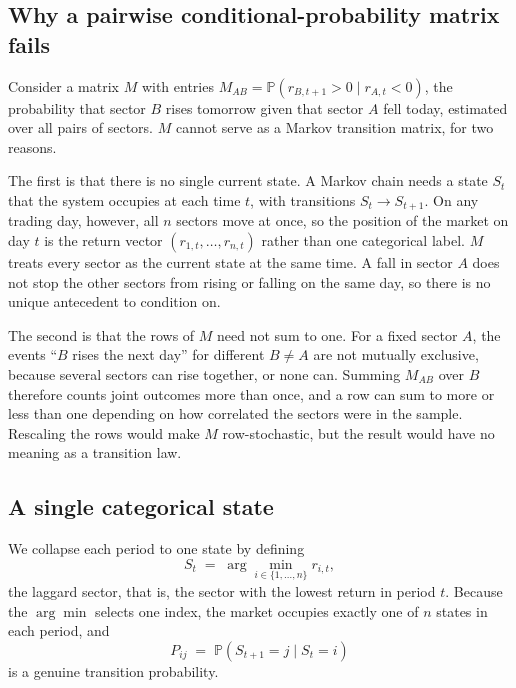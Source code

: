 \documentclass[11pt]{article}
\begin{document}
\subsection{Why a pairwise conditional-probability matrix fails}

Consider a matrix $M$ with entries $M_{AB} = \mathbb P(r_{B,t+1} > 0 \mid r_{A,t} < 0)$, the probability that sector $B$ rises tomorrow given that sector $A$ fell today, estimated over all pairs of sectors. $M$ cannot serve as a Markov transition matrix, for two reasons.

The first is that there is no single current state. A Markov chain needs a state $S_t$ that the system occupies at each time $t$, with transitions $S_t \to S_{t+1}$. On any trading day, however, all $n$ sectors move at once, so the position of the market on day $t$ is the return vector $(r_{1,t},\dots,r_{n,t})$ rather than one categorical label. $M$ treats every sector as the current state at the same time. A fall in sector $A$ does not stop the other sectors from rising or falling on the same day, so there is no unique antecedent to condition on.

The second is that the rows of $M$ need not sum to one. For a fixed sector $A$, the events ``$B$ rises the next day'' for different $B \neq A$ are not mutually exclusive, because several sectors can rise together, or none can. Summing $M_{AB}$ over $B$ therefore counts joint outcomes more than once, and a row can sum to more or less than one depending on how correlated the sectors were in the sample. Rescaling the rows would make $M$ row-stochastic, but the result would have no meaning as a transition law.

\subsection{A single categorical state}

We collapse each period to one state by defining
\begin{equation}
S_t \;=\; \arg\min_{i \in \{1,\dots,n\}} r_{i,t},
\label{eq:laggard}
\end{equation}
the laggard sector, that is, the sector with the lowest return in period $t$. Because the $\arg\min$ selects one index, the market occupies exactly one of $n$ states in each period, and
\begin{equation}
P_{ij} \;=\; \mathbb P(S_{t+1} = j \mid S_t = i)
\end{equation}
is a genuine transition probability.
\end{document}
